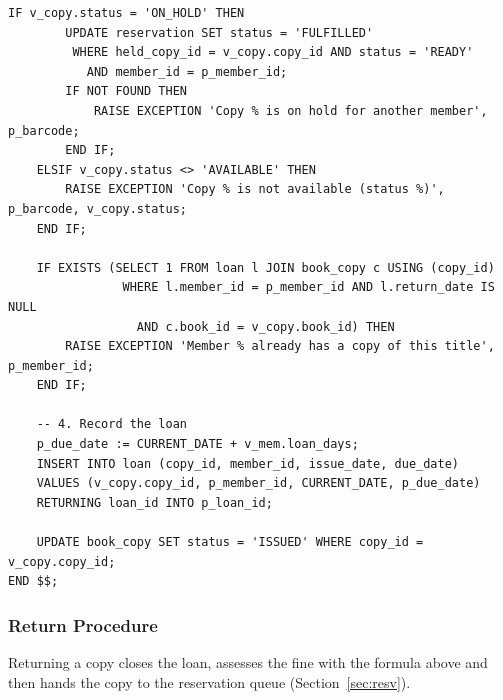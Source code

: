 \documentclass[11pt,a4paper]{report}
\begin{document}
\begin{lstlisting}[caption={Fine calculation and the \texttt{sp\_issue\_book} procedure}, label={lst:issue}]
    IF v_copy.status = 'ON_HOLD' THEN
        UPDATE reservation SET status = 'FULFILLED'
         WHERE held_copy_id = v_copy.copy_id AND status = 'READY'
           AND member_id = p_member_id;
        IF NOT FOUND THEN
            RAISE EXCEPTION 'Copy % is on hold for another member', p_barcode;
        END IF;
    ELSIF v_copy.status <> 'AVAILABLE' THEN
        RAISE EXCEPTION 'Copy % is not available (status %)', p_barcode, v_copy.status;
    END IF;

    IF EXISTS (SELECT 1 FROM loan l JOIN book_copy c USING (copy_id)
                WHERE l.member_id = p_member_id AND l.return_date IS NULL
                  AND c.book_id = v_copy.book_id) THEN
        RAISE EXCEPTION 'Member % already has a copy of this title', p_member_id;
    END IF;

    -- 4. Record the loan
    p_due_date := CURRENT_DATE + v_mem.loan_days;
    INSERT INTO loan (copy_id, member_id, issue_date, due_date)
    VALUES (v_copy.copy_id, p_member_id, CURRENT_DATE, p_due_date)
    RETURNING loan_id INTO p_loan_id;

    UPDATE book_copy SET status = 'ISSUED' WHERE copy_id = v_copy.copy_id;
END $$;
\end{lstlisting}

\subsubsection{Return Procedure}
Returning a copy closes the loan, assesses the fine with the formula above and then hands the copy to the reservation queue (Section~\ref{sec:resv}).
\end{document}
